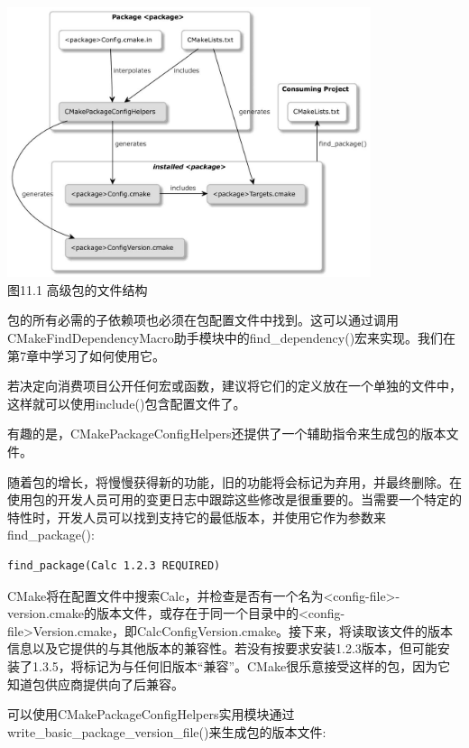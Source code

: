 \begin{center}
\includegraphics[width=0.8\textwidth]{content/3/chapter11/images/1.jpg}\\
图11.1 高级包的文件结构
\end{center}

包的所有必需的子依赖项也必须在包配置文件中找到。这可以通过调用CMakeFindDependencyMacro助手模块中的find\_dependency()宏来实现。我们在第7章中学习了如何使用它。

若决定向消费项目公开任何宏或函数，建议将它们的定义放在一个单独的文件中，这样就可以使用include()包含配置文件了。

有趣的是，CMakePackageConfigHelpers还提供了一个辅助指令来生成包的版本文件。


随着包的增长，将慢慢获得新的功能，旧的功能将会标记为弃用，并最终删除。在使用包的开发人员可用的变更日志中跟踪这些修改是很重要的。当需要一个特定的特性时，开发人员可以找到支持它的最低版本，并使用它作为参数来find\_package():

\begin{lstlisting}[style=styleCMake]
find_package(Calc 1.2.3 REQUIRED)
\end{lstlisting}

CMake将在配置文件中搜索Calc，并检查是否有一个名为<config-file>-version.cmake的版本文件，或存在于同一个目录中的<config-file>Version.cmake，即CalcConfigVersion.cmake。接下来，将读取该文件的版本信息以及它提供的与其他版本的兼容性。若没有按要求安装1.2.3版本，但可能安装了1.3.5，将标记为与任何旧版本“兼容”。CMake很乐意接受这样的包，因为它知道包供应商提供向了后兼容。

可以使用CMakePackageConfigHelpers实用模块通过write\_basic\_package\_version\_file()来生成包的版本文件:

